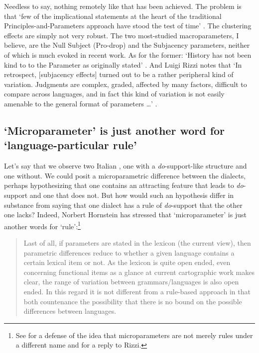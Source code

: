\documentclass[output=paper,
modfonts
]{LSP/langsci}
\begin{document}
Needless to say, nothing remotely like that has been achieved. The
problem is that `few of the implicational statements at the heart of the
traditional Principles-and-Parameters approach have stood the test of
time' \citep[216]{boeckx2011}. The clustering effects are simply not very
robust. The two most-studied macroparameters, I believe, are the Null
Subject (Pro-drop) and the Subjacency parameters, neither of which is
much evoked in recent work. As for the former: `History has not been kind to
to the  Parameter as originally stated' \citep[352]{baker2008}. And
Luigi Rizzi notes that `In retrospect, {[}subjacency effects{]} turned
out to be a rather peripheral kind of variation. Judgments are complex,
graded, affected by many factors, difficult to compare across languages,
and in fact this kind of variation is not easily amenable to the general
format of parameters \ldots{}' \citep[16]{rizzi2014}.

\subsection{`Microparameter' is just another word for `language-particular
rule'}

Let's say that we observe two Italian , one with a
\emph{do}-support-like structure and one without. We could posit a
microparametric difference between the dialects, perhaps hypothesizing
that one contains an attracting feature that leads to \emph{do}-support
and one that does not. But how would such an hypothesis differ in
substance from saying that one dialect has a rule of \emph{do}-support
that the other one lacks? Indeed, Norbert Hornstein has stressed that
`microparameter' is just another words for `rule':\footnote{See \citet[22--27]{rizzi2014} for a defense of the idea that microparameters are not
  merely rules under a different name and \citet{boeckx2014} for a reply to
  Rizzi.}

\begin{quote}
Last of all, if parameters are stated in the lexicon (the current view),
then parametric differences reduce to whether a given language contains
a certain lexical item or not. As the lexicon is quite open ended, even
concerning functional items as a glance at current cartographic work
makes clear, the range of variation between grammars/languages is also
open ended. In this regard it is not different from a rule-based
approach in that both countenance the possibility that there is no bound
on the possible differences between languages. \citep[165]{hornstein2009}
\end{quote}
\end{document}
